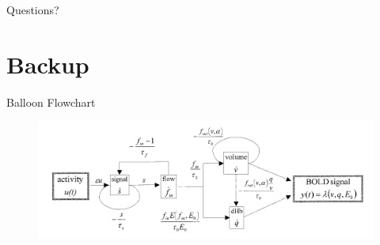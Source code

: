 \documentclass{beamer}
\begin{document}
\begin{frame}{Questions?}
\end{frame}


\appendix

\section{Backup}
\begin{frame}{Balloon Flowchart}
\begin{figure}
\includegraphics[width=\textwidth]{backup_balloon}
\end{figure}
\end{frame}
\end{document}
